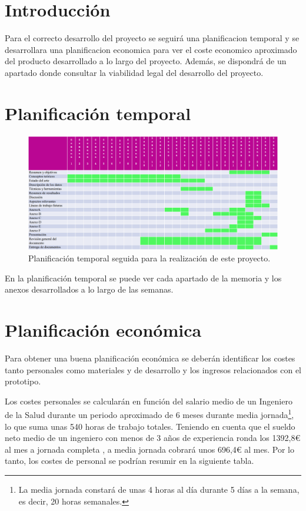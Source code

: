 
\section{Introducción}
Para el correcto desarrollo del proyecto se seguirá una planificacion temporal y se desarrollara una planificacion economica para ver el coste economico aproximado del producto desarrollado a lo largo del proyecto. Además, se dispondrá de un apartado donde consultar la viabilidad legal del desarrollo del proyecto.

\section{Planificación temporal}
\begin{figure}[h]
    \centering
    \includegraphics[width=1\textwidth]{img/PlanificacionTemporal.png}
    \caption{Planificación temporal seguida para la realización de este proyecto.}
    \label{fig:planTemporal} 
\end{figure}

En la planificación temporal se puede ver cada apartado de la memoria y los anexos desarrollados a lo largo de las semanas. 

\section{Planificación económica}

Para obtener una buena planificación económica se deberán identificar los costes tanto personales como materiales y de desarrollo y los ingresos relacionados con el prototipo.

Los costes personales se calcularán en función del salario medio de un Ingeniero de la Salud durante un periodo aproximado de 6 meses durante media jornada\footnote{La media jornada constará de unas 4 horas al día durante 5 días a la semana, es decir, 20 horas semanales.}, lo que suma unas 540 horas de trabajo totales. Teniendo en cuenta que el sueldo neto medio de un ingeniero con menos de 3 años de experiencia ronda los 1392,8€ al mes a jornada completa \cite{SueldoBruto}, a media jornada cobrará unos 696,4€ al mes. Por lo tanto, los costes de personal se podrían resumir en la siguiente tabla.

